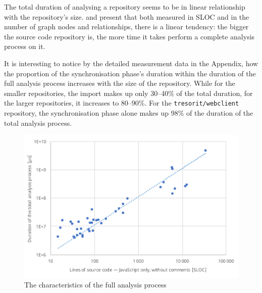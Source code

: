 The total duration of analysing a repository seems to be in linear relationship with the repository's size.  and  present that both measured in SLOC and in the number of graph nodes and relationships, there is a linear tendency: the bigger the source code repository is, the more time it takes perform a complete analysis process on it.

It is interesting to notice by the detailed measurement data in the Appendix, how the proportion of the synchronisation phase's duration within the duration of the full analysis process increases with the size of the repository. While for the smaller repositories, the import makes up only 30–40\% of the total duration, for the larger repositories, it increases to 80–90\%. For the \lstinline{tresorit/webclient} repository, the synchronisation phase alone makes up 98\% of the duration of the total analysis process.

\begin{figure}[!p]
	\centerfloat
	\includegraphics[width=\textwidth-1cm,clip]{figures/measurement-totaltime-sloc.pdf}
	\caption{The characteristics of the full analysis process}
	\label{fig:measurement-totaltime-sloc}
\end{figure}

